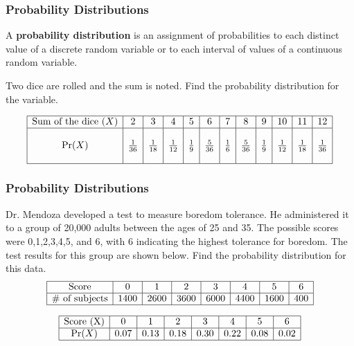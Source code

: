 \documentclass{beamer}
\theoremstyle{definition}
\begin{document}
\begin{frame}
\frametitle{Probability Distributions}\pause
\begin{definition}
A \textbf{probability distribution} is an assignment of probabilities to each distinct value of a discrete random variable or to each interval of values of a continuous random variable.
\end{definition}\pause
\begin{example}
Two dice are rolled and the sum is noted.  Find the probability distribution for the variable.
\end{example}\pause
$$\begin{array}{|c|c|c|c|c|c|c|c|c|c|c|c|}
\hline
\text{Sum of the dice }(X)&2&3&4&5&6&7&8&9&10&11&12\\
\hline
&&&&&&&&&&&\\
\Pr(X)&\frac{1}{36}&\frac{1}{18}&\frac{1}{12}&\frac{1}{9}&\frac{5}{36}&\frac{1}{6}&\frac{5}{36}&\frac{1}{9}&\frac{1}{12}&\frac{1}{18}&\frac{1}{36}\\
&&&&&&&&&&&\\
\hline
\end{array}$$
\end{frame}

\begin{frame}
\frametitle{Probability Distributions}\pause
\begin{example}
Dr. Mendoza developed a test to measure boredom tolerance.  He administered it to a group of 20,000 adults between the ages of 25 and 35.  The possible scores were 0,1,2,3,4,5, and 6, with 6 indicating the highest tolerance for boredom.  The test results for this group are shown below.  Find the probability distribution for this data.
$$\begin{array}{|c|c|c|c|c|c|c|c|}
\hline
\text{Score}&0&1&2&3&4&5&6\\
\hline
\text{\# of subjects}&1400&2600&3600&6000&4400&1600&400\\
\hline
\end{array}$$
\end{example}\pause
$$\begin{array}{|c|c|c|c|c|c|c|c|}
\hline
\text{Score (X)}&0&1&2&3&4&5&6\\
\hline
\Pr(X)&0.07&0.13&0.18&0.30&0.22&0.08&0.02\\
\hline
\end{array}$$
\end{frame}
\end{document}

